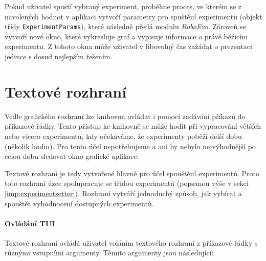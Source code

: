 Pokud uživatel spustí vybraný experiment, proběhne proces, ve kterém se z
navolených hodnot v aplikaci vytvoří parametry pro spuštění experimentu (objekt
třídy \texttt{ExperimentParams}), které následně předá modulu \emph{RoboEvo}.
Zároveň se vytvoří nové okno, které vykresluje graf a vypisuje informace o
právě běžícím experimentu. Z tohoto okna může uživatel v libovolný čas zažádat
o prezentaci jedince s dosud nejlepším řešením.

\section{Textové rozhraní} \label{imp:TUI}
Vedle grafického rozhraní lze knihovna ovládat i pomocí zadávání příkazů do
příkazové řádky. Tento přístup ke knihovně se může hodit při vypracování
větších nebo vícero experimentů, kdy očekáváme, že experimenty poběží delší
dobu (několik hodin). Pro tento účel nepotřebujeme a ani by nebylo
nejvýhodnější po celou dobu sledovat okno grafické aplikace.

Textové rozhraní je tedy vytvořené hlavně pro účel spouštění experimentů. Proto
toto rozhraní úzce spolupracuje se třídou experimentů (popsanou výše v sekci
\ref{imp:experimentsetter}). Rozhraní vytváří jednoduchý způsob, jak vybírat a
spouštět vyhodnocení dostupných experimentů.

\paragraph{Ovládání TUI}
Textové rozhraní ovládá uživatel voláním textového rozhraní z příkazové řádky s
různými vstupními argumenty. Těmito argumenty jsou následující:

